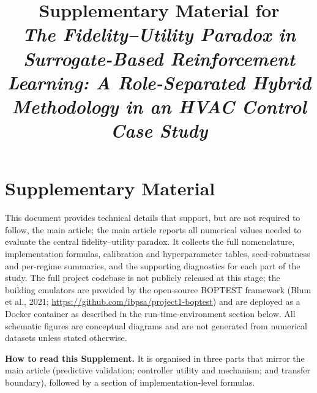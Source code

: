 \documentclass[11pt,a4paper]{article}
\title{Supplementary Material for\\[2pt]
\emph{The Fidelity--Utility Paradox in Surrogate-Based
Reinforcement Learning: A Role-Separated Hybrid Methodology in an HVAC Control Case Study}}
\author{}
\date{}
\begin{document}
\maketitle
\section*{Supplementary Material}
This document provides technical details that support, but are not required to follow, the main article; the main article reports all numerical values needed to evaluate the central fidelity--utility paradox. It collects the full nomenclature, implementation formulas, calibration and hyperparameter tables, seed-robustness and per-regime summaries, and the supporting diagnostics for each part of the study. The full project codebase is not publicly released at this stage; the building emulators are provided by the open-source BOPTEST framework (Blum et al., 2021; \url{https://github.com/ibpsa/project1-boptest}) and are deployed as a Docker container as described in the run-time-environment section below. All schematic figures are conceptual diagrams and are not generated from numerical datasets unless stated otherwise.\par
\medskip\noindent\textbf{How to read this Supplement.} It is organised in three parts that mirror the main article (predictive validation; controller utility and mechanism; and transfer boundary), followed by a section of implementation-level formulas.\par
\medskip\noindent{}\par\medskip
\end{document}
